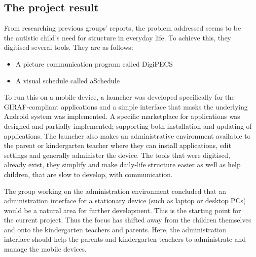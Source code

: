 \subsection{The project result}
From researching previous groups' reports, the problem addressed seems to be the autistic child's need for structure in everyday life. To achieve this, they digitised several tools. They are as follows:
\begin{itemize}
	\item A picture communication program called DigiPECS
	\item A visual schedule called aSchedule
\end{itemize}

To run this on a mobile device, a launcher was developed specifically for the GIRAF-compliant applications and a simple interface that masks the underlying Android system was implemented. A specific marketplace for applications was designed and partially implemented; supporting both installation and updating of applications. The launcher also makes an administrative environment available to the parent or kindergarten teacher where they can install applications, edit settings and generally administer the device.
The tools that were digitised, already exist, they simplify and make daily-life structure easier as well as help children, that are slow to develop, with communication.\cite{giraffactors}

The group working on the administration environment concluded that an administration interface for a stationary device (such as laptop or desktop PCs) would be a natural area for further development. This is the starting point for the current project.
Thus the focus has shifted away from the children themselves and onto the kindergarten teachers and parents. Here, the administration interface should help the parents and kindergarten teachers to administrate and manage the mobile devices.\cite{giraffactors}
